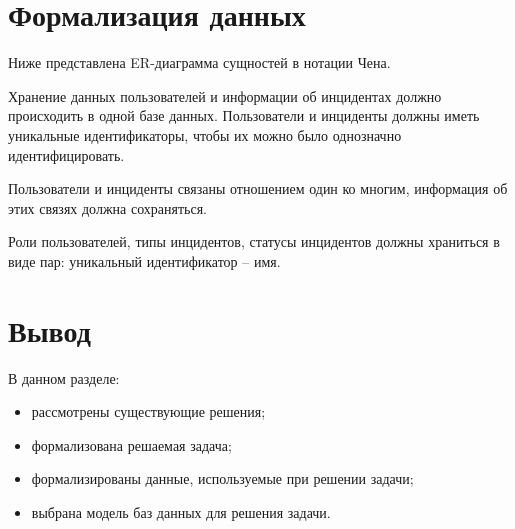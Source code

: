 \newpage
\section{Формализация данных}

Ниже представлена ER-диаграмма сущностей в нотации Чена.

Хранение данных пользователей и информации об инцидентах должно происходить в одной базе данных.
Пользователи и инциденты должны иметь уникальные идентификаторы, чтобы их можно было однозначно идентифицировать.

Пользователи и инциденты связаны отношением один ко многим, информация об этих связях должна сохраняться.

Роли пользователей, типы инцидентов, статусы инцидентов должны храниться в виде пар: уникальный идентификатор -- имя. 


\section*{Вывод}

В данном разделе:
\begin{itemize}
    \item рассмотрены существующие решения;
    \item формализована решаемая задача;
    \item формализированы данные, используемые при решении задачи;
    \item выбрана модель баз данных для решения задачи.
\end{itemize}
